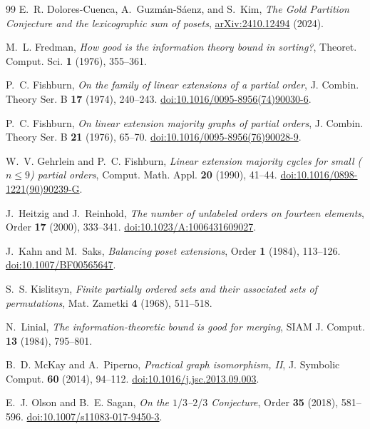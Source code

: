 \documentclass[11pt]{article}
\theoremstyle{definition}
\begin{document}
\begin{thebibliography}{99}
E.~R. Dolores-Cuenca, A.~Guzm\'an-S\'aenz, and S.~Kim,
\emph{The Gold Partition Conjecture and the lexicographic sum of posets},
\href{https://doi.org/10.48550/arXiv.2410.12494}
{arXiv:2410.12494} (2024).

M.~L. Fredman,
\emph{How good is the information theory bound in sorting?},
Theoret. Comput. Sci. \textbf{1} (1976), 355--361.

P.~C. Fishburn,
\emph{On the family of linear extensions of a partial order},
J. Combin. Theory Ser. B \textbf{17} (1974), 240--243.
\href{https://doi.org/10.1016/0095-8956(74)90030-6}
{doi:10.1016/0095-8956(74)90030-6}.

P.~C. Fishburn,
\emph{On linear extension majority graphs of partial orders},
J. Combin. Theory Ser. B \textbf{21} (1976), 65--70.
\href{https://doi.org/10.1016/0095-8956(76)90028-9}
{doi:10.1016/0095-8956(76)90028-9}.

W.~V. Gehrlein and P.~C. Fishburn,
\emph{Linear extension majority cycles for small ($n\leq9$) partial orders},
Comput. Math. Appl. \textbf{20} (1990), 41--44.
\href{https://doi.org/10.1016/0898-1221(90)90239-G}
{doi:10.1016/0898-1221(90)90239-G}.

J.~Heitzig and J.~Reinhold,
\emph{The number of unlabeled orders on fourteen elements},
Order \textbf{17} (2000), 333--341.
\href{https://doi.org/10.1023/A:1006431609027}
{doi:10.1023/A:1006431609027}.

J.~Kahn and M.~Saks,
\emph{Balancing poset extensions},
Order \textbf{1} (1984), 113--126.
\href{https://doi.org/10.1007/BF00565647}{doi:10.1007/BF00565647}.

S.~S. Kislitsyn,
\emph{Finite partially ordered sets and their associated sets of
permutations},
Mat. Zametki \textbf{4} (1968), 511--518.

N.~Linial,
\emph{The information-theoretic bound is good for merging},
SIAM J. Comput. \textbf{13} (1984), 795--801.

B.~D. McKay and A.~Piperno,
\emph{Practical graph isomorphism, II},
J. Symbolic Comput. \textbf{60} (2014), 94--112.
\href{https://doi.org/10.1016/j.jsc.2013.09.003}
{doi:10.1016/j.jsc.2013.09.003}.

E.~J. Olson and B.~E. Sagan,
\emph{On the $1/3$--$2/3$ Conjecture},
Order \textbf{35} (2018), 581--596.
\href{https://doi.org/10.1007/s11083-017-9450-3}
{doi:10.1007/s11083-017-9450-3}.


\end{thebibliography}
\end{document}
